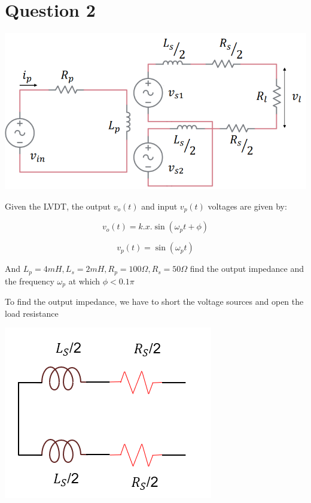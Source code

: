 \documentclass{article}
\begin{document}
\section*{Question 2}

\begin{center}
    \includegraphics*[scale=0.5]{lvdt.png}
\end{center}

Given the LVDT, the output $v_o(t)$ and input $v_p(t)$ voltages are given by:

\begin{equation*}
    v_o(t) = k . x . \sin(\omega_p t + \phi) 
\end{equation*}

\begin{equation*}
    v_p(t) = \sin(\omega_p t) 
\end{equation*}


And $L_p = 4mH, L_s = 2mH, R_p = 100 \Omega,
R_s = 50 \Omega$ find the output impedance and the frequency 
$\omega_p$ at which $\phi < 0.1\pi$\newline



To find the output impedance, we have to short the voltage sources and open the load resistance
\begin{center}
    \includegraphics*[scale=0.7]{ckt.png}
\end{center}
\end{document}
